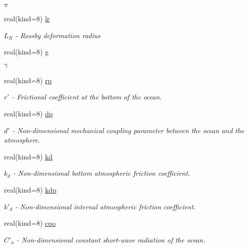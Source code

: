 \begin{DoxyCompactItemize}
\begin{DoxyCompactList}\small\item\em $\pi$ \end{DoxyCompactList}\item 
real(kind=8) \hyperlink{namespaceparams_a3082530044275cbd794604b81a7e6be0}{lr}
\begin{DoxyCompactList}\small\item\em $L_R$ -\/ Rossby deformation radius \end{DoxyCompactList}\item 
real(kind=8) \hyperlink{namespaceparams_afb5953f2f72e02fa67d474979127e79d}{g}
\begin{DoxyCompactList}\small\item\em $\gamma$ \end{DoxyCompactList}\item 
real(kind=8) \hyperlink{namespaceparams_ae93d91e6b6dbca141006f84d1c467921}{rp}
\begin{DoxyCompactList}\small\item\em $r'$ -\/ Frictional coefficient at the bottom of the ocean. \end{DoxyCompactList}\item 
real(kind=8) \hyperlink{namespaceparams_aee7fb664acd19367183ac09fdfe5ebe0}{dp}
\begin{DoxyCompactList}\small\item\em $d'$ -\/ Non-\/dimensional mechanical coupling parameter between the ocean and the atmosphere. \end{DoxyCompactList}\item 
real(kind=8) \hyperlink{namespaceparams_ae9bae2195091caeb7918dcbc3e57f109}{kd}
\begin{DoxyCompactList}\small\item\em $k_d$ -\/ Non-\/dimensional bottom atmospheric friction coefficient. \end{DoxyCompactList}\item 
real(kind=8) \hyperlink{namespaceparams_a764d9607a4fdabf5e51f36e90fd7e568}{kdp}
\begin{DoxyCompactList}\small\item\em $k'_d$ -\/ Non-\/dimensional internal atmospheric friction coefficient. \end{DoxyCompactList}\item 
real(kind=8) \hyperlink{namespaceparams_a89b8bfb0d5a9275b0301c8ebe1a92da7}{cpo}
\begin{DoxyCompactList}\small\item\em $C'_a$ -\/ Non-\/dimensional constant short-\/wave radiation of the ocean. \end{DoxyCompactList}\item 

\end{DoxyCompactItemize}
